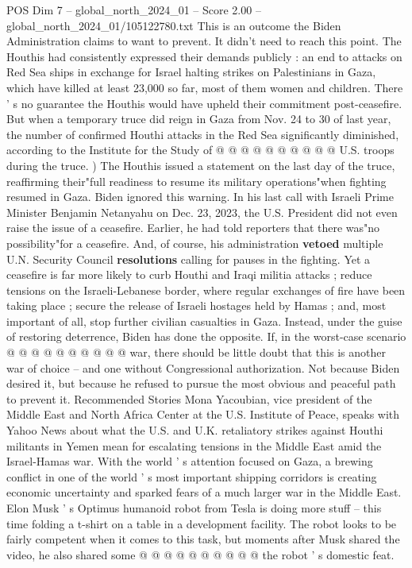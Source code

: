 \begin{textsample}{POS Dim 7 – global\_north\_2024\_01 – Score 2.00 – global\_north\_2024\_01/105122780.txt}
This is an outcome the Biden Administration claims to want to prevent.
It didn't need to reach this point.
The Houthis had consistently expressed their demands publicly : an end to attacks on Red Sea ships in exchange for Israel halting strikes on Palestinians in Gaza, which have killed at least 23,000 so far, most of them women and children.
There ' s no guarantee the Houthis would have upheld their commitment post-ceasefire.
But when a temporary truce did reign in Gaza from Nov. 24 to 30 of last year, the number of confirmed Houthi attacks in the Red Sea significantly diminished, according to the Institute for the Study of @ @ @ @ @ @ @ @ @ @ U.S. troops during the truce. ) The Houthis issued a statement on the last day of the truce, reaffirming their"full readiness to resume its military operations"when fighting resumed in Gaza.
Biden ignored this warning.
In his last call with Israeli Prime Minister Benjamin Netanyahu on Dec. 23, 2023, the U.S.
President did not even raise the issue of a ceasefire.
Earlier, he had told reporters that there was"no possibility"for a ceasefire.
And, of course, his administration \textbf{vetoed} multiple U.N.
Security Council \textbf{resolutions} calling for pauses in the fighting.
Yet a ceasefire is far more likely to curb Houthi and Iraqi militia attacks ; reduce tensions on the Israeli-Lebanese border, where regular exchanges of fire have been taking place ; secure the release of Israeli hostages held by Hamas ; and, most important of all, stop further civilian casualties in Gaza.
Instead, under the guise of restoring deterrence, Biden has done the opposite.
If, in the worst-case scenario @ @ @ @ @ @ @ @ @ @ war, there should be little doubt that this is another war of choice -- and one without Congressional authorization.
Not because Biden desired it, but because he refused to pursue the most obvious and peaceful path to prevent it.
Recommended Stories Mona Yacoubian, vice president of the Middle East and North Africa Center at the U.S.
Institute of Peace, speaks with Yahoo News about what the U.S. and U.K. retaliatory strikes against Houthi militants in Yemen mean for escalating tensions in the Middle East amid the Israel-Hamas war.
With the world ' s attention focused on Gaza, a brewing conflict in one of the world ' s most important shipping corridors is creating economic uncertainty and sparked fears of a much larger war in the Middle East.
Elon Musk ' s Optimus humanoid robot from Tesla is doing more stuff -- this time folding a t-shirt on a table in a development facility.
The robot looks to be fairly competent when it comes to this task, but moments after Musk shared the video, he also shared some @ @ @ @ @ @ @ @ @ @ the robot ' s domestic feat.

\end{textsample}
